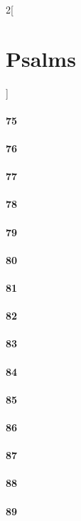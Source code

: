 \documentclass{book}
\begin{document}
\begin{multicols}{2}[\part{Psalms}]
\subsection*{75}
\subsection*{76}
\subsection*{77}
\subsection*{78}
\subsection*{79}
\subsection*{80}
\subsection*{81}
\subsection*{82}
\subsection*{83}
\subsection*{84}
\subsection*{85}
\subsection*{86}
\subsection*{87}
\subsection*{88}
\subsection*{89}

\end{multicols}
\end{document}
